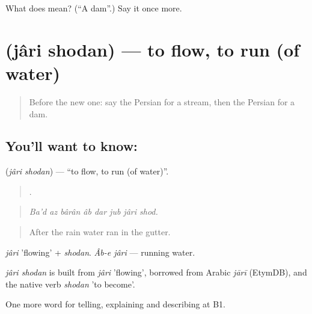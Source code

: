 \begin{tcolorbox}[breakable,colback=teal!4,colframe=teal!35!black,title={Before you move on}]
What does  mean? (\textquotedblleft{}A dam\textquotedblright{}.) Say it once more.
\end{tcolorbox}
\section[\texorpdfstring{\fa{جاری} \fa{شدن} (jâri shodan)}{جاری شدن (jâri shodan)}]{  (jâri shodan) — to flow, to run (of water)}

\label{lesson:FA-C469-jari-shodan}



\begin{quote}
Before the new one: say the Persian for a stream, then the Persian for a dam.
\end{quote}

\subsection*{You'll want to know:  }
\textbf{ } (\emph{jâri shodan}) — \textquotedblleft{}to flow, to run (of water)\textquotedblright{}.

\begin{quote}
       .
\end{quote}

\begin{quote}
\emph{Ba'd az bârân âb dar jub jâri shod.}
\end{quote}

\begin{quote}
After the rain water ran in the gutter.
\end{quote}

\emph{jâri} 'flowing' + \emph{shodan}. \emph{Âb-e jâri} — running water.

\begin{cousinweb}
\emph{jâri shodan} is built from \emph{jâri} 'flowing', borrowed from Arabic \emph{jārī} (EtymDB), and the native verb \emph{shodan} 'to become'.
\end{cousinweb}

\begin{grammarlens}[title={What you've built}]
One more word for telling, explaining and describing at B1.
\end{grammarlens}

